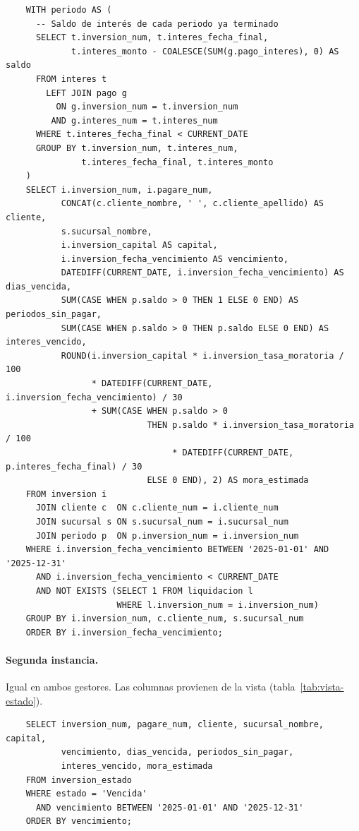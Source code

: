 \begin{verbatim}
	WITH periodo AS (
	  -- Saldo de interés de cada periodo ya terminado
	  SELECT t.inversion_num, t.interes_fecha_final,
	         t.interes_monto - COALESCE(SUM(g.pago_interes), 0) AS saldo
	  FROM interes t
	    LEFT JOIN pago g
	      ON g.inversion_num = t.inversion_num
	     AND g.interes_num = t.interes_num
	  WHERE t.interes_fecha_final < CURRENT_DATE
	  GROUP BY t.inversion_num, t.interes_num,
	           t.interes_fecha_final, t.interes_monto
	)
	SELECT i.inversion_num, i.pagare_num,
	       CONCAT(c.cliente_nombre, ' ', c.cliente_apellido) AS cliente,
	       s.sucursal_nombre,
	       i.inversion_capital AS capital,
	       i.inversion_fecha_vencimiento AS vencimiento,
	       DATEDIFF(CURRENT_DATE, i.inversion_fecha_vencimiento) AS dias_vencida,
	       SUM(CASE WHEN p.saldo > 0 THEN 1 ELSE 0 END) AS periodos_sin_pagar,
	       SUM(CASE WHEN p.saldo > 0 THEN p.saldo ELSE 0 END) AS interes_vencido,
	       ROUND(i.inversion_capital * i.inversion_tasa_moratoria / 100
	             * DATEDIFF(CURRENT_DATE, i.inversion_fecha_vencimiento) / 30
	             + SUM(CASE WHEN p.saldo > 0
	                        THEN p.saldo * i.inversion_tasa_moratoria / 100
	                             * DATEDIFF(CURRENT_DATE, p.interes_fecha_final) / 30
	                        ELSE 0 END), 2) AS mora_estimada
	FROM inversion i
	  JOIN cliente c  ON c.cliente_num = i.cliente_num
	  JOIN sucursal s ON s.sucursal_num = i.sucursal_num
	  JOIN periodo p  ON p.inversion_num = i.inversion_num
	WHERE i.inversion_fecha_vencimiento BETWEEN '2025-01-01' AND '2025-12-31'
	  AND i.inversion_fecha_vencimiento < CURRENT_DATE
	  AND NOT EXISTS (SELECT 1 FROM liquidacion l
	                  WHERE l.inversion_num = i.inversion_num)
	GROUP BY i.inversion_num, c.cliente_num, s.sucursal_num
	ORDER BY i.inversion_fecha_vencimiento;
\end{verbatim}

\paragraph{Segunda instancia.} Igual en ambos gestores. Las columnas provienen de la vista  (tabla~\ref{tab:vista-estado}).

\begin{verbatim}
	SELECT inversion_num, pagare_num, cliente, sucursal_nombre, capital,
	       vencimiento, dias_vencida, periodos_sin_pagar,
	       interes_vencido, mora_estimada
	FROM inversion_estado
	WHERE estado = 'Vencida'
	  AND vencimiento BETWEEN '2025-01-01' AND '2025-12-31'
	ORDER BY vencimiento;
\end{verbatim}

